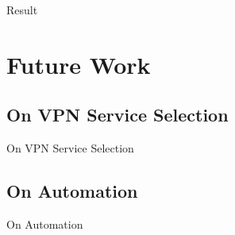 \documentclass{beamer}
\begin{document}
\begin{frame}{Result}
\end{frame}

\section{Future Work}

\subsection{On VPN Service Selection}

\begin{frame}{On VPN Service Selection}
\end{frame}

\subsection{On Automation}

\begin{frame}{On Automation}
\end{frame}
\end{document}
